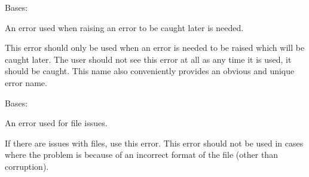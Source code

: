 \documentclass[letterpaper,11pt,english]{sphinxmanual}
\begin{document}
\begin{savenotes}\begin{fulllineitems}
\label{\detokenize{code/lezargus.library.logging:lezargus.library.logging.ExpectedCaughtError}}
\pysigstartsignatures
{}
\pysigstopsignatures
\sphinxAtStartPar
Bases: {\hyperref[\detokenize{code/lezargus.library.logging:lezargus.library.logging.LezargusBaseError}]{}}

\sphinxAtStartPar
An error used when raising an error to be caught later is needed.

\sphinxAtStartPar
This error should only be used when an error is needed to be raised which
will be caught later. The user should not see this error at all as
any time it is used, it should be caught. This name also conveniently
provides an obvious and unique error name.

\end{fulllineitems}\end{savenotes}


\begin{savenotes}\begin{fulllineitems}
\label{\detokenize{code/lezargus.library.logging:lezargus.library.logging.FileError}}
\pysigstartsignatures
{}
\pysigstopsignatures
\sphinxAtStartPar
Bases: {\hyperref[\detokenize{code/lezargus.library.logging:lezargus.library.logging.LezargusError}]{}}

\sphinxAtStartPar
An error used for file issues.

\sphinxAtStartPar
If there are issues with files, use this error. This error should not be
used in cases where the problem is because of an incorrect format of the
file (other than corruption).

\end{fulllineitems}\end{savenotes}

\end{document}
